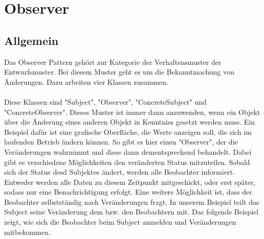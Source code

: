 
\chapter{Observer}

\section{Allgemein}
Das Observer Pattern gehört zur Kategorie der Verhaltensmuster der Entwurfsmuster. 
Bei diesem Muster geht es um die Bekanntmachung von Änderungen. Dazu arbeiten vier 
Klassen zusammen.\\ \\
Diese Klassen sind "Subject", "Observer", "ConcreteSubject" und "ConcreteObserver". 
Dieses Muster ist immer dann anzuwenden, wenn ein Objekt über die Änderung eines anderen 
Objekt in Kenntniss gesetzt werden muss. Ein Beispiel dafür ist eine grafische Oberfläche,
 die Werte anzeigen soll, die sich im laufenden Betrieb ändern können. So gibt es hier 
 einen "Observer", der die Veränderungen wahrnimmt und diese dann dementsprechend 
 behandelt. Dabei gibt es verschiedene Möglichkeiten den veränderten Status mitzuteilen. 
 Sobald sich der Status desd Subjektes ändert, werden alle Beobachter informiert. 
 Entweder werden alle Daten zu diesem Zeitpunkt mitgeschickt, oder erst später, 
 sodass nur eine Benachrichtigung erfolgt. Eine weitere Möglichkeit ist, dass der 
 Beobachter selbstständig nach Veränderungen fragt. In unserem Beispiel teilt das 
 Subject seine Veränderung dem bzw. den Beobachtern mit. Das folgende Beispiel zeigt, 
 wie sich die Beobachter beim Subject anmelden und Veränderungen mitbekommen. 
